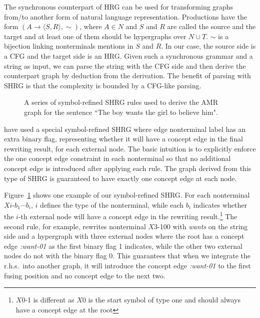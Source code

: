 The synchronous counterpart of HRG can be used for transforming graphs from/to another form of natural language representation. 
Productions have the form $(A\to \langle S, R\rangle , \sim)$, where $A \in N$ and $S$ and $R$ are called the source and the target and at least one of them should be
hypergraphs over $N\cup T$. $\sim$ is a bijection linking nonterminals mentions in $S$ and $R$.
In our case, the source side is a CFG and the target side is an HRG\@. Given such a synchronous grammar and a string as input, we can 
parse the string with the CFG side and then derive the counterpart graph by deduction from the derivation. The benefit of 
parsing with SHRG is that the complexity is bounded by a CFG-like parsing.

\begin{figure}
\begin{center}
\caption{A series of symbol-refined SHRG rules used to derive the AMR graph for the sentence ``The boy wants the girl to believe him".}
\label{fig:shrg-example}
\vspace{-1em}
\end{center}
\end{figure}
 have used a special symbol-refined SHRG where
edge nonterminal label has an extra binary
flag, representing whether it will have a concept edge in the
final rewriting result, for each external node. The basic intuition is to explicitly enforce the one concept edge constraint
in each nonterminal so that no additional concept edge is introduced after applying each rule. The graph
derived from this type of SHRG is guaranteed to have exactly one concept edge at each node.


Figure~\ref{fig:shrg-example} shows one example of our symbol-refined SHRG\@.
For each nonterminal $Xi$-$b_1\cdots b_i$, $i$ defines the type of the nonterminal, while
each $b_i$ indicates whether the $i$-th external node will have a concept edge
in the rewriting result.\footnote{$X0$-1 is different as $X0$ is the start symbol of type one and should always have a concept edge at the root}
The second rule, for example, rewrites nonterminal $X3$-100 with {\em wants} on the string side and a hypergraph with three external nodes where 
the root has a concept edge {\em :want-01} as the first binary flag 1 indicates, while the other two external nodes do not with the binary flag 0. 
This guarantees that when we integrate the r.h.s.\ into
another graph, it will introduce the concept edge {\em :want-01} to the first fusing position
and no concept edge to the next two.
